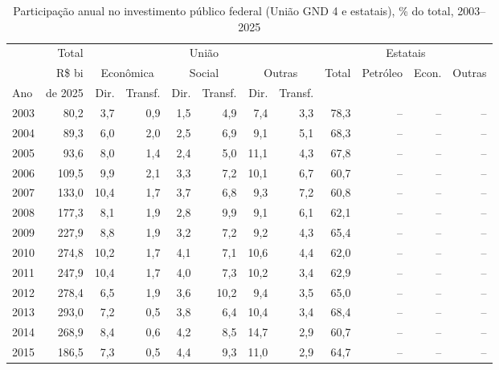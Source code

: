 \begin{table}[htbp]
\centering
\caption{Participa\c{c}\~ao anual no investimento p\'ublico federal (Uni\~ao GND 4 e estatais), \% do total, 2003--2025}
\label{tab:a3_participacoes}
\scriptsize
\setlength{\tabcolsep}{3pt}
\begin{tabular}{lrrrrrrrrrrr}
\toprule
 & Total & \multicolumn{6}{c}{Uni\~ao} & \multicolumn{4}{c}{Estatais} \\
\cmidrule(lr){3-8}\cmidrule(lr){9-12}
 & R\$ bi & \multicolumn{2}{c}{Econ\^omica} & \multicolumn{2}{c}{Social} & \multicolumn{2}{c}{Outras} & Total & Petr\'oleo & Econ. & Outras \\
\cmidrule(lr){3-4}\cmidrule(lr){5-6}\cmidrule(lr){7-8}
Ano & de 2025 & Dir. & Transf. & Dir. & Transf. & Dir. & Transf. & & & & \\
\midrule
2003 & 80{,}2 & 3{,}7 & 0{,}9 & 1{,}5 & 4{,}9 & 7{,}4 & 3{,}3 & 78{,}3 & -- & -- & -- \\
2004 & 89{,}3 & 6{,}0 & 2{,}0 & 2{,}5 & 6{,}9 & 9{,}1 & 5{,}1 & 68{,}3 & -- & -- & -- \\
2005 & 93{,}6 & 8{,}0 & 1{,}4 & 2{,}4 & 5{,}0 & 11{,}1 & 4{,}3 & 67{,}8 & -- & -- & -- \\
2006 & 109{,}5 & 9{,}9 & 2{,}1 & 3{,}3 & 7{,}2 & 10{,}1 & 6{,}7 & 60{,}7 & -- & -- & -- \\
2007 & 133{,}0 & 10{,}4 & 1{,}7 & 3{,}7 & 6{,}8 & 9{,}3 & 7{,}2 & 60{,}8 & -- & -- & -- \\
2008 & 177{,}3 & 8{,}1 & 1{,}9 & 2{,}8 & 9{,}9 & 9{,}1 & 6{,}1 & 62{,}1 & -- & -- & -- \\
2009 & 227{,}9 & 8{,}8 & 1{,}9 & 3{,}2 & 7{,}2 & 9{,}2 & 4{,}3 & 65{,}4 & -- & -- & -- \\
2010 & 274{,}8 & 10{,}2 & 1{,}7 & 4{,}1 & 7{,}1 & 10{,}6 & 4{,}4 & 62{,}0 & -- & -- & -- \\
2011 & 247{,}9 & 10{,}4 & 1{,}7 & 4{,}0 & 7{,}3 & 10{,}2 & 3{,}4 & 62{,}9 & -- & -- & -- \\
2012 & 278{,}4 & 6{,}5 & 1{,}9 & 3{,}6 & 10{,}2 & 9{,}4 & 3{,}5 & 65{,}0 & -- & -- & -- \\
2013 & 293{,}0 & 7{,}2 & 0{,}5 & 3{,}8 & 6{,}4 & 10{,}4 & 3{,}4 & 68{,}4 & -- & -- & -- \\
2014 & 268{,}9 & 8{,}4 & 0{,}6 & 4{,}2 & 8{,}5 & 14{,}7 & 2{,}9 & 60{,}7 & -- & -- & -- \\
2015 & 186{,}5 & 7{,}3 & 0{,}5 & 4{,}4 & 9{,}3 & 11{,}0 & 2{,}9 & 64{,}7 & -- & -- & -- \\

\end{tabular}
\end{table}
